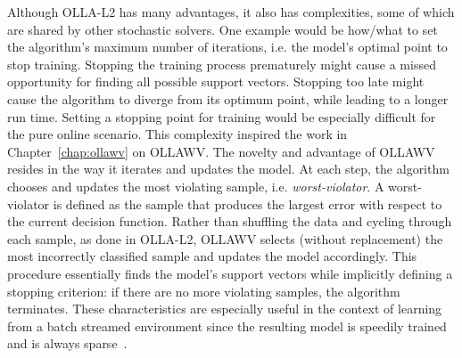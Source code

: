 \documentclass[reqno]{vcuthesis}
\numberwithin{equation}{chapter}
\begin{document}
Although OLLA-L2 has many advantages, it also has complexities, some of which are shared by other stochastic solvers. One example would be how/what to set the algorithm's maximum number of iterations, i.e. the model's optimal point to stop training. Stopping the training process prematurely might cause a missed opportunity for finding all possible support vectors. Stopping too late might cause the algorithm to diverge from its optimum point, while leading to a longer run time. Setting a stopping point for training would be especially difficult for the pure online scenario. This complexity inspired the work in Chapter~\ref{chap:ollawv} on OLLAWV. The novelty and advantage of OLLAWV resides in the way it iterates and updates the model. At each step, the algorithm chooses and updates the most violating sample, i.e. \textit{worst-violator}. A worst-violator is defined as the sample that produces the largest error with respect to the current decision function. Rather than shuffling the data and cycling through each sample, as done in OLLA-L2, OLLAWV selects (without replacement) the most incorrectly classified sample and updates the model accordingly. This procedure essentially finds the model's support vectors while implicitly defining a stopping criterion: if there are no more violating samples, the algorithm terminates. These characteristics are especially useful in the context of learning from a batch streamed environment since the resulting model is speedily trained and is always sparse~\cite{melki2018ollawv}. 
\end{document}
